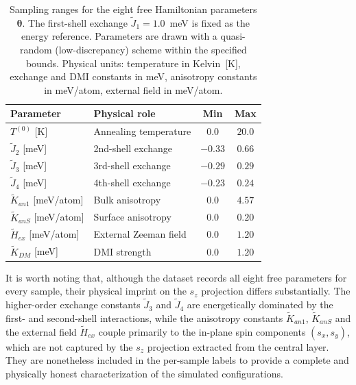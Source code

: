 \documentclass[letterpaper, 12, one column]{article}
\begin{document}
\begin{table}[H]
\centering
\caption{Sampling ranges for the eight free Hamiltonian parameters $\boldsymbol{\theta}$. The first-shell exchange $\tilde{J}_1 = 1.0$~meV is fixed as the energy reference. Parameters are drawn with a quasi-random (low-discrepancy) scheme within the specified bounds. Physical units: temperature in Kelvin~[K], exchange and DMI constants in meV, anisotropy constants in meV/atom, external field in meV/atom.}
\label{tab:param_ranges}
\begin{tabular}{llcc}
\hline
\textbf{Parameter} & \textbf{Physical role} & \textbf{Min} & \textbf{Max} \\
\hline
$T^{(0)}$ [K]                & Annealing temperature  & $0.0$  & $20.0$ \\
$\tilde{J}_2$ [meV]          & 2nd-shell exchange     & $-0.33$ & $0.66$  \\
$\tilde{J}_3$ [meV]          & 3rd-shell exchange     & $-0.29$ & $0.29$  \\
$\tilde{J}_4$ [meV]          & 4th-shell exchange     & $-0.23$ & $0.24$  \\
$\tilde{K}_{an1}$ [meV/atom] & Bulk anisotropy        & $0.0$  & $4.57$  \\
$\tilde{K}_{anS}$ [meV/atom] & Surface anisotropy     & $0.0$  & $0.20$  \\
$\tilde{H}_{ex}$ [meV/atom]  & External Zeeman field  & $0.0$  & $1.20$  \\
$\tilde{K}_{DM}$ [meV]       & DMI strength           & $0.0$  & $1.20$  \\
\hline
\end{tabular}
\end{table}

It is worth noting that, although the dataset records all eight free parameters for every sample, their physical imprint on the $s_z$ projection differs substantially. The higher-order exchange constants $\tilde{J}_3$ and $\tilde{J}_4$ are energetically dominated by the first- and second-shell interactions, while the anisotropy constants $\tilde{K}_{an1}$, $\tilde{K}_{anS}$ and the external field $\tilde{H}_{ex}$ couple primarily to the in-plane spin components $(s_x, s_y)$, which are not captured by the $s_z$ projection extracted from the central layer. They are nonetheless included in the per-sample labels to provide a complete and physically honest characterization of the simulated configurations.
\end{document}
